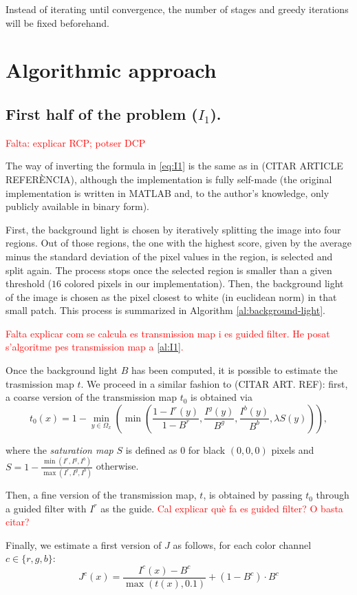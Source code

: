 \documentclass[twocolumn,twoside,a4paper,10pt]{IEEEtran}
\newcommand{\Frank}[1]{\textcolor{red}{#1}}
\begin{document}
Instead of iterating until convergence, the number of stages and greedy iterations will be fixed beforehand.

\section{Algorithmic approach}
\subsection{First half of the problem (\(I_1\)).}
\Frank{Falta: explicar RCP; potser DCP}

The way of inverting the formula in \cref{eq:I1} is the same as in (CITAR ARTICLE REFERÈNCIA), although the implementation is fully self-made (the original implementation is written in MATLAB and, to the author's knowledge, only publicly available in binary form).

First, the background light is chosen by iteratively splitting the image into four regions. Out of those regions, the one with the highest score, given by the average minus the standard deviation of the pixel values in the region, is selected and split again. The process stops once the selected region is smaller than a given threshold (\(16\) colored pixels in our implementation). Then, the background light of the image is chosen as the pixel closest to white (in euclidean norm) in that small patch. This process is summarized in Algorithm \ref{al:background-light}.

\Frank{Falta explicar com se calcula es transmission map i es guided filter. He posat s'algoritme pes transmission map a \ref{al:I1}.}

Once the background light \(B\) has been computed, it is possible to estimate the trasmission map \(t\). We proceed in a similar fashion to (CITAR ART. REF): first, a coarse version of the transmission map \(t_0\) is obtained via
\[
  t_0(x) = 1 - \min_{y\in\Omega_x}\left(\min\left(\frac{1-I^r(y)}{1-B^r}, \frac{I^g(y)}{B^g}, \frac{I^b(y)}{B^b}, \lambda S(y)\right)\right)
,\]

where the \textit{saturation map} \(S\) is defined as \(0\) for black \((0, 0, 0)\) pixels and \(S=1-\frac{\min(I^r, I^g, I^b)}{\max(I^r, I^g, I^b)}\) otherwise.

Then, a fine version of the transmission map, \(t\), is obtained by passing \(t_0\) through a guided filter with \(I^r\) as the guide. \Frank{Cal explicar què fa es guided filter? O basta citar?}

Finally, we estimate a first version of \(J\) as follows, for each color channel \(c\in\{r, g, b\}\):
\begin{equation}\label{eq:J0}
  J^c(x) = \frac{I^c(x) - B^c}{\max(t(x), 0.1)} + (1-B^c)\cdot B^c
\end{equation}
\end{document}
